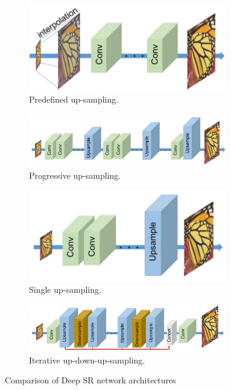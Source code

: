 \begin{figure}
    \centering
    \begin{subfigure}[b]{0.33\textwidth}
        \centering
        \includegraphics[width=0.95\textwidth]{figures/neural_networks/predefined_upsample.png}
        \caption{Predefined up-sampling.}\label{fig:predefups}
    \end{subfigure}
    \begin{subfigure}[b]{0.66\textwidth}
        \centering
        \includegraphics[width=0.95\textwidth]{figures/neural_networks/progressive_upsample.png}
        \caption{Progressive up-sampling.}\label{fig:profups}
    \end{subfigure}

    \begin{subfigure}[b]{0.33\textwidth}
        \centering
        \includegraphics[width=0.95\textwidth]{figures/neural_networks/single_upsample.png}
        \caption{Single up-sampling.}\label{fig:singups}
    \end{subfigure}
    \begin{subfigure}[b]{0.66\textwidth}
        \centering
        \includegraphics[width=0.95\textwidth]{figures/neural_networks/iterative_upsample.png}
        \caption{Iterative up-down-up-sampling.}\label{fig:iterups}
    \end{subfigure}
    \caption{Comparison of Deep SR network architectures\cite{haris2018deep}}\label{fig:comparedeepsr}
\end{figure}